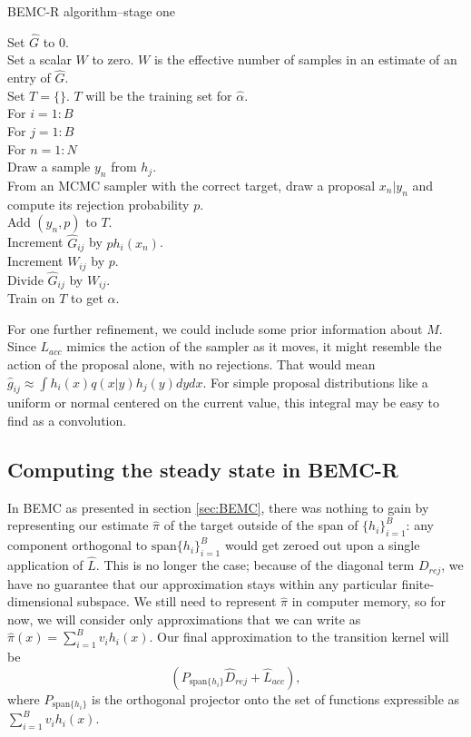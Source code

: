 \documentclass{article}
\newcommand\EMK[1]{\textcolor{purple}{EMK: #1}}
\begin{document}
\begin{algorithm}[h]
\caption{BEMC-R algorithm--stage one \label{algo:BEMC-R}}
Set $\hat{G}$ to $0$.\\ 
Set a scalar $W$ to zero. $W$ is the effective number of samples in an estimate of an entry of $\hat{G}$.\\
Set $T = \{\}$. $T$ will be the training set for $\hat{\alpha}$.\\
For $i  = 1:B$\\
\Indp
For $j = 1:B$\\
\Indp
For $n = 1:N$\\
\Indp
Draw a sample $y_n$ from $h_{j}$.\\
From an MCMC sampler with the correct target, draw a proposal $x_n|y_n$ and compute its rejection probability $p$.\\
Add $(y_n, p)$ to $T$.\\
Increment $\hat{G}_{ij}$ by $ph_{i}(x_n)$.\\
Increment $W_{ij}$ by $p$.\\
\Indm
Divide $\hat{G}_{ij}$ by $W_{ij}$.\\
\Indm
\Indm
Train on $T$ to get $\hat{\alpha}$.%
\end{algorithm}

For one further refinement, we could include some prior information about $M$. Since $L_{acc}$ mimics the action of the sampler as it moves, it might resemble the action of the proposal alone, with no rejections. That would mean $\hat{g}_{ij} \approx \int h_i(x)q(x|y)h_j(y)dydx$. For simple proposal distributions like a uniform or normal centered on the current value, this integral may be easy to find as a convolution.

\subsection{Computing the steady state in BEMC-R}
\label{BEMC-R-target}


In BEMC as presented in section \ref{sec:BEMC}, there was nothing to gain by representing our estimate $\hat{\pi}$ of the target outside of the span of $\{h_i\}_{i=1}^B$: any component orthogonal to $\text{span}\{h_i\}_{i=1}^B$ would get zeroed out upon a single application of $\hat{L}$. This is no longer the case; because of the diagonal term $D_{rej}$, we have no guarantee that our approximation stays within any particular finite-dimensional subspace. We still need to represent $\hat{\pi}$ in computer memory, so for now, we will %
consider only approximations that we can write as $\hat{\pi}(x) = \sum_{i=1}^{B}v_{i}h_i(x)$. Our final approximation to the transition kernel will be $$ (P_{\text{span}\{h_i\}}\hat{D}_{rej} + 
\hat{L}_{acc}),$$ where $P_{\text{span}\{h_i\}}$ is the orthogonal projector onto the set of functions expressible as $\sum_{i=1}^{B}v_{i}h_i(x)$.
\end{document}
